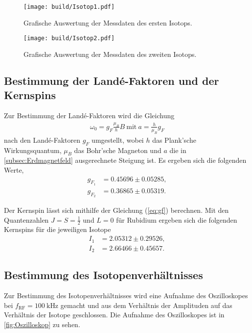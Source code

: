 \begin{figure}[H]
    \centering
    \texttt{[image: build/Isotop1.pdf]}
    \caption{Grafische Auswertung der Messdaten des ersten Isotops.}
    \label{fig:plot1}
\end{figure}

\begin{figure}[H]
    \centering
    \texttt{[image: build/Isotop2.pdf]}
    \caption{Grafische Auswertung der Messdaten des zweiten Isotops.}
    \label{fig:plot2}
\end{figure}

\subsection{Bestimmung der Landé-Faktoren und der Kernspins}
\label{subsec:lande}

Zur Bestimmung der Landé-Faktoren wird die Gleichung 
\begin{align}
    \omega_0=g_F\frac{\mu_B}{h}B\ \text{mit}\ a=\frac{h}{\mu_B}g_F
\end{align}
nach den Landé-Faktoren $g_F$ umgestellt, wobei $h$ das Plank'sche Wirkungsquantum, $\mu_B$ das Bohr'sche Magneton und $a$ die in \autoref{subsec:Erdmagnetfeld} ausgerechnete Steigung ist.
Es ergeben sich die folgenden Werte,
\begin{align*}
    g_{F_1} &= 0.45696 \pm 0.05285, \\
    g_{F_2} &= 0.36865 \pm 0.05319.
\end{align*}

\noindent
Der Kernspin lässt sich mithilfe der Gleichung (\ref{eq:gf}) berechnen. Mit den Quantenzahlen $J=S=\frac 12$ und $L=0$ für Rubidium \cite{Anleitung21} ergeben sich die folgenden
Kernspins für die jeweiligen Isotope
\begin{align*}
    I_1 &= 2.05312 \pm 0.29526, \\
    I_2 &= 2.66466 \pm 0.45657.
\end{align*}

\subsection{Bestimmung des Isotopenverhältnisses}
\label{subsec:isotopenverhaeltnis}

Zur Bestimmung des Isotopenverhältnisses wird eine Aufnahme des Oszilloskopes bei $f_{\text{RF}} = \SI{100}{\kilo\hertz}$ gemacht und aus dem Verhältnis der Amplituden auf das
Verhältnis der Isotope geschlossen. Die Aufnahme des Oszilloskopes ist in \autoref{fig:Oszilloskop} zu sehen.

